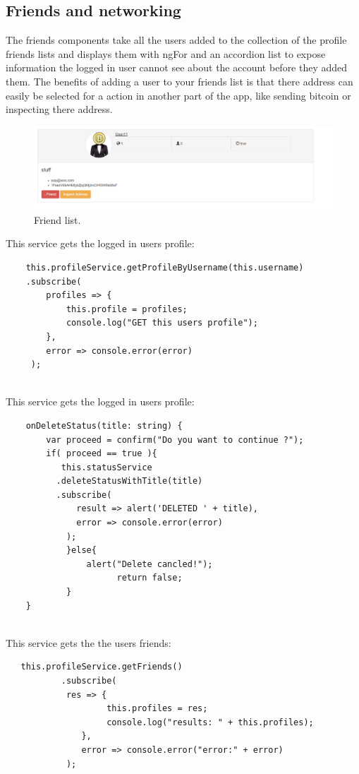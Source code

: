 \subsection{Friends and networking}
The friends components take all the users added to the collection of the profile friends lists and displays them with ngFor and an accordion list to expose information the logged in user cannot see about the account before they added them. The benefits of adding a user to your friends list is that there address can easily be selected for a action in another part of the app, like sending bitcoin or inspecting there address.

\begin{figure}[H]
\centering
\includegraphics[]{img/FriendsList.png}
\caption{Friend list.}
\end{figure}

This service gets the logged in users profile:
\begin{lstlisting}
    this.profileService.getProfileByUsername(this.username)
    .subscribe(
        profiles => {
            this.profile = profiles;
            console.log("GET this users profile");  
        },
        error => console.error(error)
     );
    
\end{lstlisting}

This service gets the logged in users profile:
\begin{lstlisting}
    onDeleteStatus(title: string) {
        var proceed = confirm("Do you want to continue ?");
        if( proceed == true ){
           this.statusService
          .deleteStatusWithTitle(title)
          .subscribe(
              result => alert('DELETED ' + title),
              error => console.error(error)
            );
            }else{
                alert("Delete cancled!");
                      return false;
            }
    }
  
\end{lstlisting}

This service gets the the users friends:
\begin{lstlisting}
   this.profileService.getFriends()
           .subscribe(
            res => {
                    this.profiles = res;
                    console.log("results: " + this.profiles);
               },
               error => console.error("error:" + error)
            );
  
\end{lstlisting}

